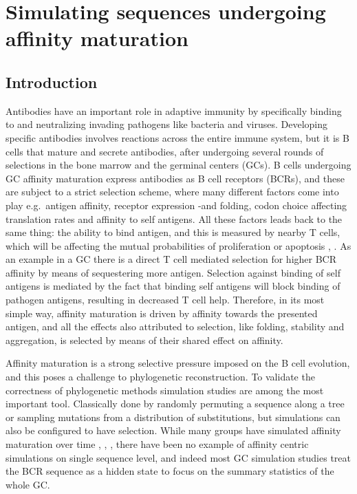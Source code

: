 \chapter{Simulating sequences undergoing affinity maturation}

\section{Introduction}
Antibodies have an important role in adaptive immunity by specifically binding to and neutralizing invading pathogens like bacteria and viruses.
Developing specific antibodies involves reactions across the entire immune system, but it is B cells that mature and secrete antibodies, after undergoing several rounds of selections in the bone marrow and the germinal centers (GCs).
B cells undergoing GC affinity maturation express antibodies as B cell receptors (BCRs), and these are subject to a strict selection scheme, where many different factors come into play e.g.\ antigen affinity, receptor expression -and folding, codon choice affecting translation rates and affinity to self antigens.
All these factors leads back to the same thing: the ability to bind antigen, and this is measured by nearby T cells, which will be affecting the mutual probabilities of proliferation or apoptosis \cite{Bannard_Cyster_2017}, \cite{victora2012germinal}.
As an example in a GC there is a direct T cell mediated selection for higher BCR affinity by means of sequestering more antigen.
Selection against binding of self antigens is mediated by the fact that binding self antigens will block binding of pathogen antigens, resulting in decreased T cell help.
Therefore, in its most simple way, affinity maturation is driven by affinity towards the presented antigen, and all the effects also attributed to selection, like folding, stability and aggregation, is selected by means of their shared effect on affinity.

Affinity maturation is a strong selective pressure imposed on the B cell evolution, and this poses a challenge to phylogenetic reconstruction.
To validate the correctness of phylogenetic methods simulation studies are among the most important tool.
Classically done by randomly permuting a sequence along a tree or sampling mutations from a distribution of substitutions, but simulations can also be configured to have selection.
While many groups have simulated affinity maturation over time \cite{Reshetova_2017}, \cite{Balelli_2016}, \cite{Childs_Baskerville_Cobey_2015}, there have been no example of affinity centric simulations on single sequence level, and indeed most GC simulation studies treat the BCR sequence as a hidden state to focus on the summary statistics of the whole GC.

